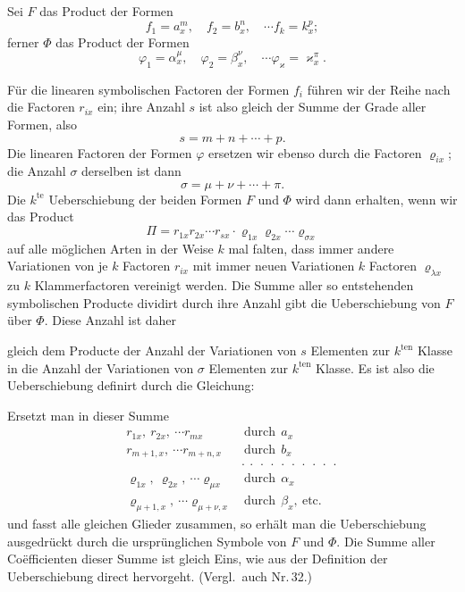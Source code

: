Sei $F$ das Product der Formen
\[
f_1=a_x^m,\quad f_2=b_x^n,\quad\cdots f_k=k_x^p;
\]
ferner $\Phi$ das Product der Formen
\[
\varphi_1=\alpha_x^\mu,\quad \varphi_2=\beta_x^\nu,\quad\cdots \varphi_\varkappa=\varkappa_x^\pi.
\]

Für die linearen symbolischen Factoren der Formen $f_i$ führen wir der
Reihe nach die Factoren $r_{ix}$ ein; ihre Anzahl $s$ ist also gleich
der Summe der Grade aller Formen, also
\[
s=m+n+\cdots+p.
\]
Die linearen Factoren der Formen $\varphi$ ersetzen wir ebenso durch
die Factoren $\varrho_{ix}$; die Anzahl $\sigma$ derselben ist dann
\[
\sigma=\mu+\nu+\cdots+\pi.
\]
Die $k^{\text{te}}$ Ueberschiebung der beiden Formen $F$ und $\Phi$
wird dann erhalten, wenn wir das Product
\[
\Pi=r_{1x}r_{2x}\cdots r_{sx}\cdot\varrho_{1x}\varrho_{2x}\cdots\varrho_{\sigma x}
\]
auf alle möglichen Arten in der Weise $k$ mal falten, dass immer
andere Variationen von je $k$ Factoren $r_{ix}$ mit immer neuen
Variationen $k$ Factoren $\varrho_{\lambda x}$ zu $k$ Klammerfactoren
vereinigt werden. Die Summe aller so entstehenden symbolischen
Producte dividirt durch ihre Anzahl gibt die Ueberschiebung von $F$
über $\Phi$. Diese Anzahl ist daher


gleich dem Producte der Anzahl der Variationen von $s$ Elementen zur
$k^{\text{ten}}$ Klasse in die Anzahl der Variationen von $\sigma$
Elementen zur $k^{\text{ten}}$ Klasse. Es ist also die Ueberschiebung
definirt durch die Gleichung:

Ersetzt man in dieser Summe
\[
\begin{aligned}
r_{1x},\ r_{2x},\ \cdots r_{mx} &\ \text{durch}\ \ a_x\\
r_{m+1,x},\ \cdots r_{m+n,x} &\ \text{durch}\ \ b_x\\
&\cdot\ \cdot\ \cdot\ \cdot\ \cdot\ \cdot\ \cdot\ \cdot\ \cdot\ \cdot\\
\varrho_{1x},\ \varrho_{2x},\ \cdots \varrho_{\mu x} &\ \text{durch}\ \ \alpha_x\\
\varrho_{\mu+1,x},\ \cdots \varrho_{\mu+\nu,x} &\ \text{durch}\ \ \beta_x,\ \text{etc.}
\end{aligned}
\]
und fasst alle gleichen Glieder zusammen, so erhält man die
Ueberschiebung ausgedrückt durch die ursprünglichen Symbole von $F$
und $\Phi$. Die Summe aller Co\"efficienten dieser Summe ist gleich
Eins, wie aus der Definition der Ueberschiebung direct hervorgeht.
(Vergl.\ auch Nr.\,32.)

